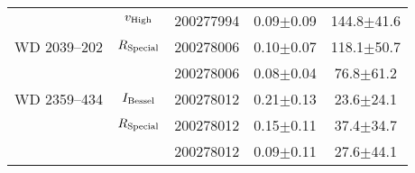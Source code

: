 \begin{table}
\begin{tabular}{lclcc}
                     & $v_{\rm High}$    & 200277994 & \phantom{0}0.09$\pm$0.09 &          144.8$\pm$41.6 \\
        WD 2039--202 & $R_{\rm Special}$ & 200278006 & \phantom{0}0.10$\pm$0.07 &          118.1$\pm$50.7 \\
                     &                   & 200278006 & \phantom{0}0.08$\pm$0.04 & \phantom{0}76.8$\pm$61.2 \\
        WD 2359--434 & $I_{\rm Bessel}$  & 200278012 & \phantom{0}0.21$\pm$0.13 & \phantom{0}23.6$\pm$24.1 \\
                     & $R_{\rm Special}$ & 200278012 & \phantom{0}0.15$\pm$0.11 & \phantom{0}37.4$\pm$34.7 \\
                     &                   & 200278012 & \phantom{0}0.09$\pm$0.11 & \phantom{0}27.6$\pm$44.1 \\
        \hline
    \end{tabular}
\end{table}        
